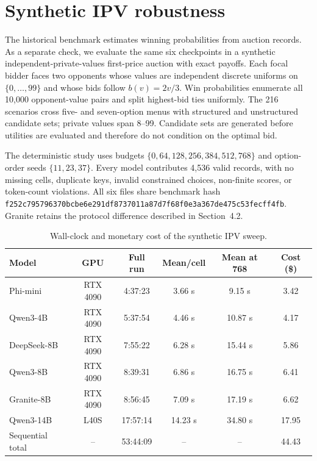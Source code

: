 \documentclass{article}
\begin{document}


\FloatBarrier
\section{Synthetic IPV robustness}
\label{app:syntheticipv}

The historical benchmark estimates winning probabilities from auction records. As a separate check, we evaluate the same six checkpoints in a synthetic independent-private-values first-price auction with exact payoffs. Each focal bidder faces two opponents whose values are independent discrete uniforms on $\{0,\ldots,99\}$ and whose bids follow $b(v)=2v/3$. Win probabilities enumerate all 10,000 opponent-value pairs and split highest-bid ties uniformly. The 216 scenarios cross five- and seven-option menus with structured and unstructured candidate sets; private values span 8--99. Candidate sets are generated before utilities are evaluated and therefore do not condition on the optimal bid.

The deterministic study uses budgets $\{0,64,128,256,384,512,768\}$ and option-order seeds $\{11,23,37\}$. Every model contributes 4,536 valid records, with no missing cells, duplicate keys, invalid constrained choices, non-finite scores, or token-count violations. All six files share benchmark hash \nolinkurl{f252c795796370bcbe6e291df8737011a87d7f68f0e3a367de475c53fecff4fb}. Granite retains the protocol difference described in Section~4.2.

\begin{table}[H]
\centering
\caption{Wall-clock and monetary cost of the synthetic IPV sweep.}
\label{tab:syntheticruntimecost}
\small
\setlength{\tabcolsep}{4pt}
\begin{tabular}{@{}lccccc@{}}
\toprule
Model & GPU & Full run & Mean/cell & Mean at 768 & Cost (\$) \\
\midrule
Phi-mini       & RTX 4090 & 4:37:23  & 3.66 s  & 9.15 s  & 3.42 \\
Qwen3-4B       & RTX 4090 & 5:37:54  & 4.46 s  & 10.87 s & 4.17 \\
DeepSeek-8B    & RTX 4090 & 7:55:22  & 6.28 s  & 15.44 s & 5.86 \\
Qwen3-8B       & RTX 4090 & 8:39:31  & 6.86 s  & 16.75 s & 6.41 \\
Granite-8B     & RTX 4090 & 8:56:45  & 7.09 s  & 17.19 s & 6.62 \\
Qwen3-14B      & L40S     & 17:57:14 & 14.23 s & 34.80 s & 17.95 \\
\midrule
Sequential total & -- & 53:44:09 & -- & -- & 44.43 \\
\bottomrule
\end{tabular}
\end{table}
\end{document}
